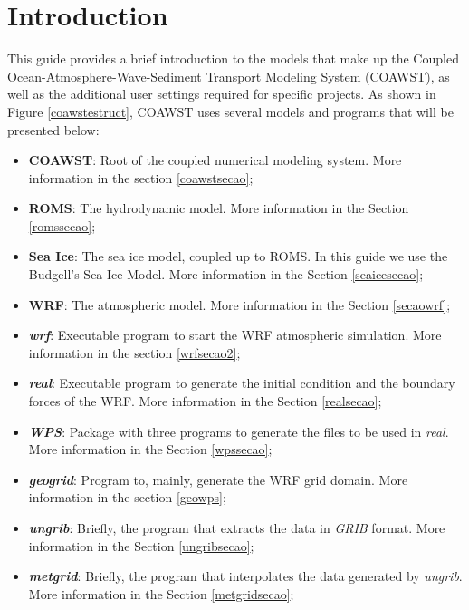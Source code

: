 \chapter{Introduction}
\bigskip

\noindent This guide provides a brief introduction to the models that make up the Coupled Ocean-Atmosphere-Wave-Sediment Transport Modeling System
(COAWST), as well as the additional user settings required for specific projects. As shown in Figure \textcolor{bleu_cite} {\ref{coawstestruct}},
COAWST uses several models and programs that will be presented below:


\bigskip

\begin{itemize}
    \item \textbf{COAWST}: Root of the coupled numerical modeling system. More information in the section \textcolor{bleu_cite}{\ref{coawstsecao}};
    \item \textbf{ROMS}: The hydrodynamic model. More information in the Section \textcolor {bleu_cite}{\ref{romssecao}};
    \item \textbf{Sea Ice}: The sea ice model, coupled up to ROMS. In this guide we use the Budgell's Sea Ice Model. More information in the Section \textcolor{bleu_cite}{\ref{seaicesecao}};
    \item \textbf{WRF}: The atmospheric model. More information in the Section \textcolor{bleu_cite}{\ref{secaowrf}};
    \item \textit{\textbf{wrf}}: Executable program to start the WRF atmospheric simulation. More information in the section \textcolor{bleu_cite}{\ref{wrfsecao2}};
    \item \textit{\textbf{real}}: Executable program to generate the initial condition and the boundary forces of the WRF. More information in the Section \textcolor{bleu_cite}{\ref{realsecao}};
    \item \textit{\textbf{WPS}}: Package with three programs to generate the files to be used in \textit {real}. More information in the Section \textcolor{bleu_cite}{\ref{wpssecao}};
    \item \textit{\textbf{geogrid}}: Program to, mainly, generate the WRF grid domain. More information in the section \textcolor{bleu_cite}{\ref{geowps}};
    \item \textit{\textbf{ungrib}}: Briefly, the program that extracts the data in \textit{GRIB} format. More information in the Section \textcolor{bleu_cite}{\ref{ungribsecao}};   
    \item \textit{\textbf{metgrid}}: Briefly, the program that interpolates the data generated by \textit {ungrib}. More information in the Section \textcolor{bleu_cite}{\ref {metgridsecao}};    

\end{itemize}
